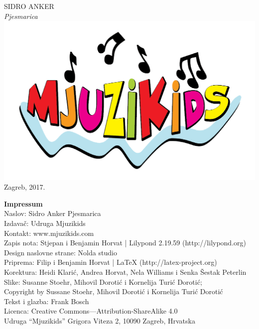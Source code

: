 \documentclass[a4paper,twoside, svgnames]{article}
\newcommand{\impresspac}{7pt}
\newcommand*{\titleTH}{\begingroup
\vspace*{5cm}
\begin{center}
{{\fontsize{50}{60}\selectfont
\textsf{\textcolor{sidro}{SIDRO} \textcolor{anker}{ANKER}}}}\\
\vspace*{0.3cm}
{\fontsize{70}{80}\selectfont
\itshape\textrm{Pjesmarica}}
\vfill %
\includegraphics[width=0.2\linewidth]{images/mjuzikids_logo}\\
\vspace*{0.5cm}
{Zagreb, 2017.}\par %
\end{center}
\endgroup}
\begin{document}
\thispagestyle {empty}
\titleTH

\newpage
\thispagestyle {empty}
\begin{center}
\vspace*{\fill}
\begin{onehalfspacing}
\textbf{\textsf{Impressum}}\\
\vspace{10pt}
Naslov: Sidro Anker Pjesmarica\\
\vspace{\impresspac}
Izdavač: Udruga Mjuzikids\\
\vspace{\impresspac}
Kontakt: www.mjuzikids.com\\
\vspace{\impresspac}
Zapis nota: Stjepan i Benjamin Horvat | Lilypond 2.19.59 (http://lilypond.org)\\
\vspace{\impresspac}
Design naslovne strane: Nolda studio\\
\vspace{\impresspac}
Priprema: Filip i Benjamin Horvat | LaTeX (http://latex-project.org)\\
\vspace{\impresspac}
Korektura: Heidi Klarić, Andrea Horvat, Nela Williams i Senka Šestak Peterlin\\
\vspace{\impresspac}
Slike: Susanne Stoehr, Mihovil Dorotić i Kornelija Turić Dorotić;\\
Copyright by Sussane Stoehr, Mihovil Dorotić i Kornelija Turić Dorotić\\
\vspace{\impresspac}
Tekst i glazba: Frank Bosch\\
\vspace{\impresspac}
Licenca: Creative Commons—Attribution-ShareAlike 4.0\\
\vspace{\impresspac}
Udruga “Mjuzikids” Grigora Viteza 2, 10090 Zagreb, Hrvatska\\
\vspace{\impresspac}
\vspace{\impresspac}
\vspace{\impresspac}


\end{onehalfspacing}
\end{center}
\end{document}
